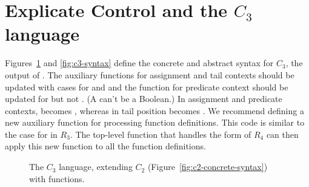 \documentclass[11pt]{book}
\newcommand{\gray}[1]{{\color{gray} #1}}
\begin{document}
\section{Explicate Control and the $C_3$ language}
\label{sec:explicate-control-r4}

Figures~\ref{fig:c3-concrete-syntax} and \ref{fig:c3-syntax} define
the concrete and abstract syntax for $C_3$, the output of
. The auxiliary functions for assignment and
tail contexts should be updated with cases for  and
 and the function for predicate context should be updated
for  but not .  (A  can't be a
Boolean.)  In assignment and predicate contexts,  becomes
, whereas in tail position  becomes
.  We recommend defining a new auxiliary function for
processing function definitions.  This code is similar to the case for
 in $R_3$.  The top-level 
function that handles the  form of $R_4$ can then
apply this new function to all the function definitions.

\begin{figure}[tp]
\fbox{
\begin{minipage}{0.96\textwidth}
\small
\[
\begin{array}{lcl}
\Atm &::=& \gray{ \Int \mid \Var \mid \key{\#t} \mid \key{\#f} }
  \\
\itm{cmp} &::= & \gray{  \key{eq?} \mid \key{<} } \\
\Exp &::= & \gray{ \Atm \mid \LP\key{read}\RP \mid \LP\key{-}\;\Atm\RP \mid \LP\key{+} \; \Atm\;\Atm\RP
      \mid \LP\key{not}\;\Atm\RP \mid \LP\itm{cmp}\;\Atm\;\Atm\RP  } \\
   &\mid& \gray{  \LP\key{allocate}\,\Int\,\Type\RP
   \mid \LP\key{vector-ref}\, \Atm\, \Int\RP  } \\
   &\mid& \gray{  \LP\key{vector-set!}\,\Atm\,\Int\,\Atm\RP \mid \LP\key{global-value} \,\itm{name}\RP \mid \LP\key{void}\RP } \\
   &\mid& \LP\key{fun-ref}~\itm{label}\RP \mid \LP\key{call} \,\Atm\,\Atm\ldots\RP \\
\Stmt &::=& \gray{ \ASSIGN{\Var}{\Exp} \mid \RETURN{\Exp} 
       \mid \LP\key{collect} \,\itm{int}\RP }\\
\Tail &::= & \gray{\RETURN{\Exp} \mid \LP\key{seq}\;\Stmt\;\Tail\RP} \\
      &\mid& \gray{\LP\key{goto}\,\itm{label}\RP
       \mid \IF{\LP\itm{cmp}\, \Atm\,\Atm\RP}{\LP\key{goto}\,\itm{label}\RP}{\LP\key{goto}\,\itm{label}\RP}} \\
      &\mid& \LP\key{tail-call}\,\Atm\,\Atm\ldots\RP \\
  \Def &::=& \LP\key{define}\; \LP\itm{label} \; [\Var \key{:} \Type]\ldots\RP \key{:} \Type \; \LP\LP\itm{label}\,\key{.}\,\Tail\RP\ldots\RP\RP \\
C_3 & ::= & \Def\ldots
\end{array}
\]
\end{minipage}
}
\caption{The $C_3$ language, extending $C_2$ (Figure~\ref{fig:c2-concrete-syntax}) with functions.}
\label{fig:c3-concrete-syntax}
\end{figure}
\end{document}
